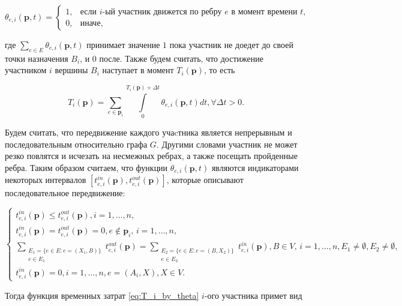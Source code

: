 \documentclass[12pt, a4paper]{article}
\begin{document}
$$
\theta_{e, i} (\textbf{p}, t) =
\begin{cases}
	1, & \text{если }  i\text{-ый участник движется по ребру $e$ в момент времени $t$,}  \\
	0, & \text{иначе},
\end{cases}
$$

где $\sum\limits_{e \in E} \theta_{e, i} (\textbf{p}, t)$ принимает значение $1$ пока участник не доедет до своей точки назначения $B_i$, и $0$ после. Также будем считать, что достижение  участником $i$ вершины $B_i$ наступает в момент $T_i(\textbf{p})$, то есть 
	
\begin{equation}
	\label{eq:T_i_by_theta}
	T_i(\textbf{p}) = \sum \limits_{e \in \textbf{p}_i} \int\limits_{0}^{T_i(\textbf{p}) + \Delta t} \theta_{e, i} (\textbf{p}, t) dt, \forall \Delta t > 0.
\end{equation}

Будем считать, что передвижение каждого учаcтника является непрерывным и последовательным относительно графа $G$. Другими словами участник не может резко повлятся и исчезать на несмежных ребрах, а также посещать пройденные ребра. Таким образом считаем, что функции $\theta_{e, i} (\textbf{p}, t)$ являются индикаторами некоторых интервалов $[t_{e, i}^{in} (\textbf{p}), t_{e, i}^{out} (\textbf{p})]$, которые описывают последовательное передвижение:

\begin{equation}
	\label{eq:restr_t}
	\begin{cases}
		t_{e, i}^{in}(\textbf{p}) \le t_{e, i}^{out}(\textbf{p}), i = 1, \dots, n,
		\\
		t_{e, i}^{in}(\textbf{p}) = t_{e, i}^{out}(\textbf{p}) = 0, e \notin \textbf{p}_i,\, i = 1, \dots, n,
		\\
		\sum \limits_{ \substack{E_1 = \{ e \in E: e = (X_1, B) \} \\ e \in E_1}} t_{e, i}^{out} (\textbf{p}) = \sum \limits_{ \substack{E_2 = \{ e \in E: e = (B, X_2) \} \\ e \in E_2}} t_{e, i}^{in} (\textbf{p}), B \in V,\, i = 1, \dots, n, E_1 \ne \emptyset, E_2 \ne \emptyset,
		\\
		t_{e, i}^{in} (\textbf{p}) = 0, i = 1, \dots, n,  e = (A_i, X), X \in V.
	\end{cases}
\end{equation}

Тогда функция временных затрат \eqref{eq:T_i_by_theta} $i$-ого участника примет вид
\end{document}
